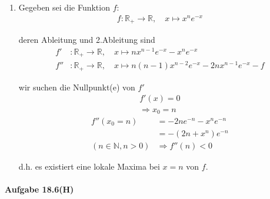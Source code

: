 \begin{enumerate}

\item[]

Gegeben sei die Funktion $f$:
\begin{align*}
f:\mathbb{R}_+ \rightarrow \mathbb{R},
\hspace{1em}
x\mapsto x^n e^{-x}
\end{align*}

deren Ableitung und 2.Ableitung sind
\begin{align*}
f'&:\mathbb{R}_+ \rightarrow \mathbb{R},
\hspace{1em}
x\mapsto n x^{n-1} e^{-x} - x^n e^{-x} \\
f''&:\mathbb{R}_+ \rightarrow \mathbb{R},
\hspace{1em}
x\mapsto n (n-1) x^{n-2} e^{-x} - 2 n x^{n-1} e^{-x} - f
\end{align*}

wir suchen die Nullpunkt(e) von $f'$
\begin{align*}
f'(x) = 0 \\
\Rightarrow x_0 = n
\end{align*}
\begin{align*}
f''(x_0=n)
&= -2 n e^{-n} - x^n e^{-n} \\
&= -( 2 n + x^n ) e^{-n} \\
(n\in\mathbb{N},n>0)
&\Rightarrow f''(n) < 0
\end{align*}

d.h. es existiert eine lokale Maxima bei $x=n$ von $f$.

\end{enumerate}

\newpage

\paragraph{Aufgabe 18.6(H)}

